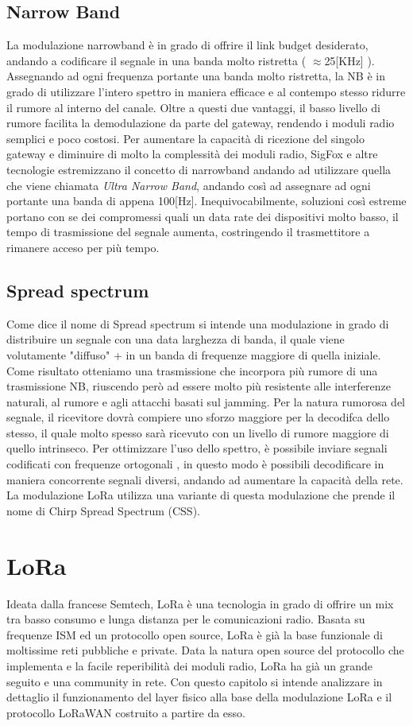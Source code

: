 \subsection{Narrow Band}
La modulazione narrowband è in grado di offrire il link budget desiderato,
andando a codificare il segnale in una banda molto ristretta ( $\approx$25[KHz]
).  Assegnando ad ogni frequenza portante una banda molto ristretta, la NB è in
grado di utilizzare l'intero spettro in maniera efficace e al contempo stesso
ridurre il rumore al interno del canale. Oltre a questi due vantaggi, il basso
livello di rumore facilita la demodulazione da parte del gateway, rendendo i
moduli radio semplici e poco costosi.  Per aumentare la capacità di ricezione
del  singolo gateway  e diminuire di molto la  complessità dei moduli radio,
SigFox e altre tecnologie  estremizzano il concetto di narrowband andando ad
utilizzare quella che viene chiamata \emph{Ultra Narrow Band},
andando così ad assegnare ad ogni portante una banda di appena 100[Hz]. 
Inequivocabilmente, soluzioni così estreme portano con se dei  compromessi 
quali un  data rate dei dispositivi molto basso, il tempo  di trasmissione del
segnale aumenta, costringendo il  trasmettitore  a rimanere acceso per più
tempo. 

\subsection{Spread spectrum} 
Come dice il nome di  Spread spectrum si intende una modulazione in grado di distribuire un
segnale con una data larghezza di banda, il quale viene volutamente  "diffuso" +
in un banda di frequenze maggiore di quella iniziale.
Come risultato otteniamo una trasmissione che incorpora più rumore di una
trasmissione NB, riuscendo però ad essere molto più resistente alle interferenze
naturali, al rumore e agli attacchi basati sul jamming.
Per la natura rumorosa del segnale, il ricevitore dovrà compiere uno sforzo
maggiore per la decodifca dello stesso, il quale molto spesso sarà ricevuto 
con un livello di rumore maggiore di quello intrinseco.
Per ottimizzare l'uso dello spettro, è possibile inviare segnali codificati con 
frequenze ortogonali , in questo modo è possibili decodificare in maniera
concorrente segnali diversi, andando ad aumentare la capacità della rete.
La modulazione LoRa utilizza una variante di questa modulazione che prende il
nome di Chirp Spread Spectrum (CSS).
\section{LoRa}
Ideata dalla francese Semtech, LoRa è una tecnologia in grado di offrire un mix
tra basso consumo e lunga distanza per le comunicazioni radio. Basata su
frequenze ISM ed un protocollo open source, LoRa è già la base funzionale di moltissime
reti pubbliche e private.
Data la natura open source del protocollo che implementa e la facile
reperibilità dei moduli radio, LoRa ha già un grande seguito e una community in
rete. Con questo capitolo si intende analizzare in dettaglio il funzionamento
del layer fisico alla base della modulazione LoRa e il protocollo LoRaWAN
costruito a partire da esso.
